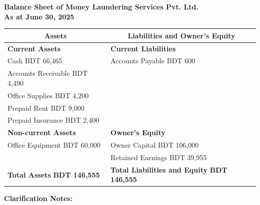 \documentclass[12pt,a4paper]{book}
\begin{document}
\vspace{0.5cm}
\clearpage
\begin{center}
\textbf{Balance Sheet of Money Laundering Services Pvt. Ltd.} \\
\textbf{As at June 30, 2025} 

\vspace{0.5cm}
\begin{tabular}{|p{8cm}|p{8cm}|}
\hline
\multicolumn{1}{|c|}{\textbf{Assets}} & \multicolumn{1}{c|}{\textbf{Liabilities and Owner’s Equity}} \\
\hline
\textbf{Current Assets} & \textbf{Current Liabilities} \\
Cash \dotfill BDT 66,465 & Accounts Payable \dotfill BDT 600 \\
Accounts Receivable \dotfill BDT 4,490 &  \\
Office Supplies \dotfill BDT 4,200 & \\
Prepaid Rent \dotfill BDT 9,000 & \\
Prepaid Insurance \dotfill BDT 2,400 & \\
\hline
\textbf{Non-current Assets} & \textbf{Owner’s Equity} \\
Office Equipment \dotfill BDT 60,000 & Owner Capital \dotfill BDT 106,000 \\
 & Retained Earnings \dotfill BDT 39,955 \\
\hline
\textbf{Total Assets} \dotfill \textbf{BDT 146,555} & \textbf{Total Liabilities and Equity} \dotfill \textbf{BDT 146,555} \\
\hline
\end{tabular}
\end{center}
\vspace{0.5cm} 

\textbf{Clarification Notes:}
\end{document}
